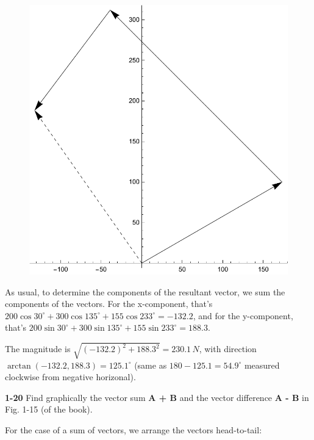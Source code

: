 \documentclass{amsart}
\begin{document}
\begin{figure}[h]
\includegraphics[scale=0.32]{1-19}
\end{figure}

As usual, to determine the components of the resultant vector, we sum the components of the vectors.
For the x-component, that's $200 \cos 30^\circ + 300 \cos 135^\circ + 155 \cos 233^\circ = -132.2$,
and for the y-component, that's $200 \sin 30^\circ + 300 \sin 135^\circ + 155 \sin 233^\circ = 188.3$.

The magnitude is $\sqrt{(-132.2)^2 + 188.3^2} = 230.1\,N$, with direction $\arctan(-132.2, 188.3) = 125.1^\circ$
(same as $180 - 125.1 = 54.9^\circ$ measured clockwise from negative horizonal).

\textbf{1-20} Find graphically the vector sum \textbf{A + B} and the vector difference \textbf{A - B} in Fig. 1-15 (of the book).

For the case of a sum of vectors, we arrange the vectors head-to-tail:
\end{document}

